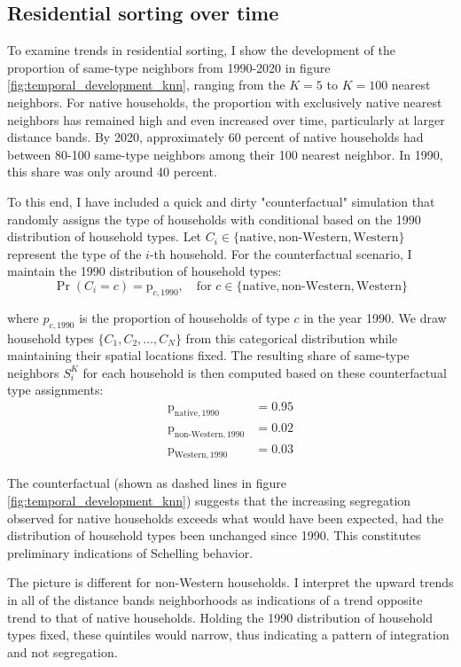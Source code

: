 \documentclass[main.tex]{subfiles}
\begin{document}
\subsection{Residential sorting over time}
To examine trends in residential sorting, I show the development of the proportion of same-type neighbors from 1990-2020 in figure \ref{fig:temporal_development_knn}, ranging from the $K=5$ to $K=100$ nearest neighbors. For native households, the proportion with exclusively native nearest neighbors has remained high and even increased over time, particularly at larger distance bands. By 2020, approximately 60 percent of native households had between 80-100 same-type neighbors among their 100 nearest neighbor. In 1990, this share was only around 40 percent.

To this end, I have included a quick and dirty "counterfactual" simulation that randomly assigns the type of households with conditional based on the 1990 distribution of household types. Let $C_i \in \{\text{native}, \text{non-Western}, \text{Western}\}$ represent the type of the $i$-th household. For the counterfactual scenario, I maintain the 1990 distribution of household types:
$$\operatorname{Pr}(C_i = c) = \mathrm{p}_{c,1990}, \quad \text{for } c \in \{\text{native}, \text{non-Western}, \text{Western}\}$$

where $p_{c,1990}$ is the proportion of households of type $c$ in the year 1990. We draw household types $\{C_1, C_2, \ldots, C_N\}$ from this categorical distribution while maintaining their spatial locations fixed. The resulting share of same-type neighbors $S_i^K$ for each household is then computed based on these counterfactual type assignments:
\begin{align*}
    \mathrm{p}_{\text{native}, 1990} &= 0.95 \\
    \mathrm{p}_{\text{non-Western}, 1990} &= 0.02 \\
    \mathrm{p}_{\text{Western}, 1990} &= 0.03
\end{align*}

The counterfactual (shown as dashed lines in figure \ref{fig:temporal_development_knn}) suggests that the increasing segregation observed for native households exceeds what would have been expected, had the distribution of household types been unchanged since 1990. This constitutes preliminary indications of Schelling behavior.

The picture is different for non-Western households. I interpret the upward trends in all of the distance bands neighborhoods as indications of a trend opposite trend to that of native households. Holding the 1990 distribution of household types fixed, these quintiles would narrow, thus indicating a pattern of integration and not segregation.
\end{document}
